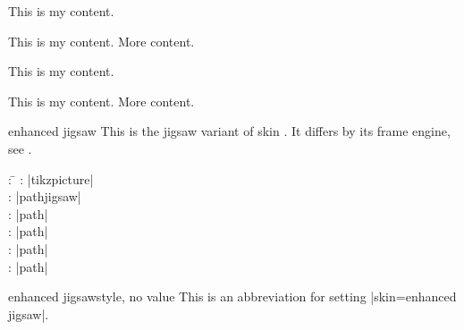 \begin{dispExample}
\begin{tcbraster}[skin=enhancedlast,raster equal height,raster columns=4,
    colback=LightGreen,colframe=DarkGreen,colbacktitle=LimeGreen!75!DarkGreen,
    left=1mm,right=1mm,top=1mm,bottom=1mm,middle=1mm]
  \begin{tcolorbox}
    This is my content.
  \end{tcolorbox}
  \begin{tcolorbox}
    This is my content.
    \tcblower
    More content.
  \end{tcolorbox}
  \begin{tcolorbox}[adjusted title=My title]
    This is my content.
  \end{tcolorbox}
  \begin{tcolorbox}[adjusted title=My title]
    This is my content.
    \tcblower
    More content.
  \end{tcolorbox}
\end{tcbraster}
\end{dispExample}


\clearpage
\begin{docSkin}{enhanced jigsaw}
  This is the jigsaw variant of skin .
  It differs by its frame engine, see .
\begin{tcolorbox}[skintable=enhanced jigsaw]
  \begin{tabbing}
    : \=\kill
    :  \> |tikzpicture|\\ 
    :           \> |pathjigsaw|\\
    : \> |path|\\ 
    :        \> |path|\\
    :    \> |path|\\
    :           \> |path|
  \end{tabbing}
\end{tcolorbox}
\end{docSkin}

\begin{docTcbKey}{enhanced jigsaw}{}{style, no value}
  This is an abbreviation for setting |skin=enhanced jigsaw|.
\end{docTcbKey}

